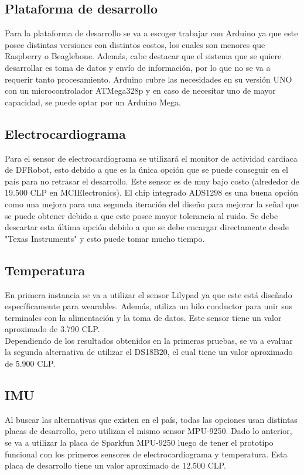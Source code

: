 \subsection{Plataforma de desarrollo}
Para la plataforma de desarrollo se va a escoger trabajar con Arduino ya que este posee distintas versiones con distintos costos, los cuales son menores que Raspberry o Beaglebone. Además, cabe destacar que el sistema que se quiere desarrollar es toma de datos y envío de información, por lo que no se va a requerir tanto procesamiento. Arduino cubre las necesidades en su versión UNO con un microcontrolador ATMega328p y en caso de necesitar uno de mayor capacidad, se puede optar por un Arduino Mega.
\subsection{Electrocardiograma}
Para el sensor de electrocardiograma se utilizará el monitor de actividad cardíaca de DFRobot, esto debido a que es la única opción que se puede conseguir en el país para no retrasar el desarrollo. Este sensor es de muy bajo costo (alrededor de 19.500 CLP en MCIElectronics).
El chip integrado ADS1298 es una buena opción como una mejora para una segunda iteración del diseño para mejorar la señal que se puede obtener debido a que este posee mayor tolerancia al ruido. Se debe descartar esta última opción debido a que se debe encargar directamente desde "Texas Instruments" y esto puede tomar mucho tiempo.

\newpage
\subsection{Temperatura}
En primera instancia se va a utilizar el sensor Lilypad ya que este está diseñado específicamente para wearables. Además, utiliza un hilo conductor para unir sus terminales con la alimentación y la toma de datos. Este sensor tiene un valor aproximado de 3.790 CLP.\\
Dependiendo de los resultados obtenidos en la primeras pruebas, se va a evaluar la segunda alternativa de utilizar el DS18B20, el cual tiene un valor aproximado de 5.900 CLP.
\subsection{IMU}
Al buscar las alternativas que existen en el país, todas las opciones usan distintas placas de desarrollo, pero utilizan el mismo sensor MPU-9250. Dado lo anterior, se va a utilizar la placa de Sparkfun MPU-9250 luego de tener el prototipo funcional con los primeros sensores de electrocardiograma y temperatura. Esta placa de desarrollo tiene un valor aproximado de 12.500 CLP.
